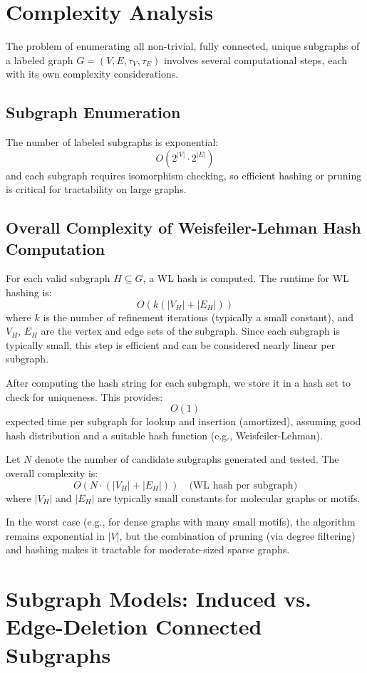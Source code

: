 \documentclass{article}
\begin{document}
\section*{Complexity Analysis}

The problem of enumerating all non-trivial, fully connected, unique subgraphs of a labeled graph \( G = (V, E, \tau_V, \tau_E) \) involves several computational steps, each with its own complexity considerations.

\subsection*{Subgraph Enumeration}


The number of labeled subgraphs is exponential:
\[
O(2^{|V|} \cdot 2^{|E|})
\]
and each subgraph requires isomorphism checking, so efficient hashing or pruning is critical for tractability on large graphs.


\subsection*{Overall Complexity of Weisfeiler-Lehman Hash Computation}

For each valid subgraph \( H \subseteq G \), a WL hash is computed. The runtime for WL hashing is:
\[
O(k(|V_H| + |E_H|))
\]
where \( k \) is the number of refinement iterations (typically a small constant), and \( V_H \), \( E_H \) are the vertex and edge sets of the subgraph. Since each subgraph is typically small, this step is efficient and can be considered nearly linear per subgraph.

After computing the hash string for each subgraph, we store it in a hash set to check for uniqueness. This provides:
\[
O(1)
\]
expected time per subgraph for lookup and insertion (amortized), assuming good hash distribution and a suitable hash function (e.g., Weisfeiler-Lehman).

Let \( N \) denote the number of candidate subgraphs generated and tested. The overall complexity is:
\[
O(N \cdot (|V_H| + |E_H|)) \quad \text{(WL hash per subgraph)}
\]
where \( |V_H| \) and \( |E_H| \) are typically small constants for molecular graphs or motifs.

In the worst case (e.g., for dense graphs with many small motifs), the algorithm remains exponential in \( |V| \), but the combination of pruning (via degree filtering) and hashing makes it tractable for moderate-sized sparse graphs.

\section*{Subgraph Models: Induced vs. Edge-Deletion Connected Subgraphs}
\end{document}
